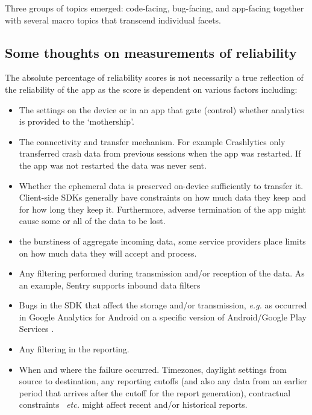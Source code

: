 Three groups of topics emerged: code-facing, bug-facing, and app-facing together with several macro topics that transcend individual facets.


\subsection{Some thoughts on measurements of reliability}
The absolute percentage of reliability scores is not necessarily a true reflection of the reliability of the app as the score is dependent on various factors including:

\begin{itemize}
    \item The settings on the device or in an app that gate (control) whether analytics is provided to the `mothership'.
    \item The connectivity and transfer mechanism. For example Crashlytics only transferred crash data from previous sessions when the app was restarted. If the app was not restarted the data was never sent.
    \item Whether the ephemeral data is preserved on-device sufficiently to transfer it. Client-side SDKs generally have constraints on how much data they keep and for how long they keep it. Furthermore, adverse termination of the app might cause some or all of the data to be lost.
    \item the burstiness of aggregate incoming data, some service providers place limits on how much data they will accept and process. 
    \item Any filtering performed during transmission and/or reception of the data. As an example, Sentry supports inbound data filters~
    \item Bugs in the SDK that affect the storage and/or transmission, \emph{e.g.} as occurred in Google Analytics for Android on a specific version of Android/Google Play Services .
    \item Any filtering in the reporting.
    \item When and where the failure occurred. Timezones, daylight settings from source to destination, any reporting cutoffs (and also any data from an earlier period that arrives after the cutoff for the report generation), contractual constraints~ \emph{etc.} might affect recent and/or historical reports.

\end{itemize}
